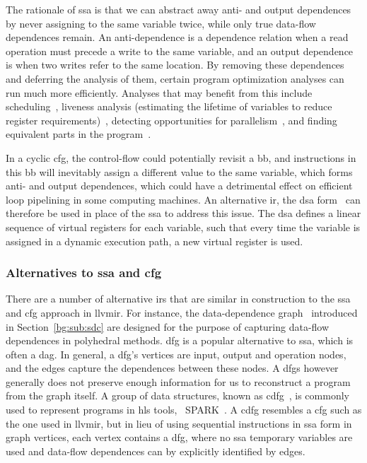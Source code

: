 The rationale of \gls{ssa} is that we can abstract away anti- and output
dependences by never assigning to the same variable twice, while only true
data-flow dependences remain.  An anti-dependence is a dependence relation
when a read operation must precede a write to the same variable, and an output
dependence is when two writes refer to the same location.  By removing these
dependences and deferring the analysis of them, certain program optimization
analyses can run much more efficiently.  Analyses that may benefit from this
include scheduling~\cite{rau94}, liveness analysis (estimating the lifetime
of variables to reduce register requirements)~\cite{cytron91}, detecting
opportunities for parallelism~\cite{cytron87}, and finding equivalent parts in
the program~\cite{alpern88}.

In a cyclic \gls{cfg}, the control-flow could potentially revisit a \gls{bb},
and instructions in this \gls{bb} will inevitably assign a different value to
the same variable, which forms anti- and output dependences, which could have
a detrimental effect on efficient loop pipelining in some computing machines.
An alternative \gls{ir}, the \gls{dsa} form~\cite{rau92} can therefore be used
in place of the \gls{ssa} to address this issue.  The \gls{dsa} defines a
linear sequence of virtual registers for each variable, such that every time
the variable is assigned in a dynamic execution path, a new virtual register is
used.

\subsubsection{Alternatives to \gls{ssa} and \gls{cfg}}

There are a number of alternative \glspl{ir} that are similar in construction
to the \gls{ssa} and \gls{cfg} approach in \gls{llvmir}\@.  For instance, the
data-dependence graph~\cite{rau94} introduced in Section~\ref{bg:sub:sdc} are
designed for the purpose of capturing data-flow dependences in polyhedral
methods. \gls{dfg} is a popular alternative to \gls{ssa}, which is often
a \gls{dag}.  In general, a \gls{dfg}'s vertices are input, output and
operation nodes, and the edges capture the dependences between these nodes.
A \glspl{dfg} however generally does not preserve enough information for us
to reconstruct a program from the graph itself.  A group of data structures,
known as \gls{cdfg}~\cite{orailoglu86}, is commonly used to represent programs
in \gls{hls} tools, \eg~SPARK~\cite{gupta04}.  A \gls{cdfg} resembles a
\gls{cfg} such as the one used in \gls{llvmir}, but in lieu of using sequential
instructions in \gls{ssa} form in graph vertices, each vertex contains a
\gls{dfg}, where no \gls{ssa} temporary variables are used and data-flow
dependences can by explicitly identified by edges.


